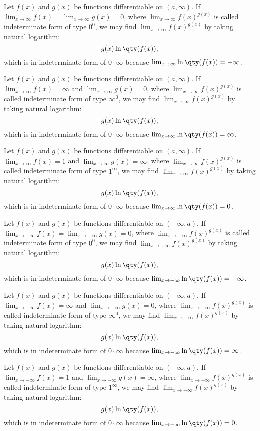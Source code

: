 \documentclass[a4paper,12pt]{report}
\begin{document}
\begin{itemize}
\begin{itemize}
Let $f(x)$ and $g(x)$ be functions differentiable on $(a,\infty)$. If $\lim_{x\to\infty}f(x)=\lim_{x\to\infty}g(x)=0$, where $\lim_{x\to\infty}f(x)^{g(x)}$ is called indeterminate form of type $0^0$, we may find $\lim_{x\to\infty}f(x)^{g(x)}$ by taking natural logarithm:
\[g(x)\ln\qty(f(x)),\]
which is in indeterminate form of $0\cdot\infty$ because $\lim_{x\to\infty}\ln\qty(f(x))=-\infty$.

Let $f(x)$ and $g(x)$ be functions differentiable on $(a,\infty)$. If $\lim_{x\to\infty}f(x)=\infty$ and $\lim_{x\to\infty}g(x)=0$, where $\lim_{x\to\infty}f(x)^{g(x)}$ is called indeterminate form of type $\infty^0$, we may find $\lim_{x\to\infty}f(x)^{g(x)}$ by taking natural logarithm:
\[g(x)\ln\qty(f(x)),\]
which is in indeterminate form of $0\cdot\infty$ because $\lim_{x\to\infty}\ln\qty(f(x))=\infty$.

Let $f(x)$ and $g(x)$ be functions differentiable on $(a,\infty)$. If $\lim_{x\to\infty}f(x)=1$ and $\lim_{x\to\infty}g(x)=\infty$, where $\lim_{x\to\infty}f(x)^{g(x)}$ is called indeterminate form of type $1^{\infty}$, we may find $\lim_{x\to\infty}f(x)^{g(x)}$ by taking natural logarithm:
\[g(x)\ln\qty(f(x)),\]
which is in indeterminate form of $0\cdot\infty$ because $\lim_{x\to\infty}\ln\qty(f(x))=0$.

Let $f(x)$ and $g(x)$ be functions differentiable on $(-\infty,a)$. If $\lim_{x\to -\infty}f(x)=\lim_{x\to -\infty}g(x)=0$, where $\lim_{x\to -\infty}f(x)^{g(x)}$ is called indeterminate form of type $0^0$, we may find $\lim_{x\to -\infty}f(x)^{g(x)}$ by taking natural logarithm:
\[g(x)\ln\qty(f(x)),\]
which is in indeterminate form of $0\cdot\infty$ because $\lim_{x\to -\infty}\ln\qty(f(x))=-\infty$.

Let $f(x)$ and $g(x)$ be functions differentiable on $(-\infty,a)$. If $\lim_{x\to -\infty}f(x)=\infty$ and $\lim_{x\to -\infty}g(x)=0$, where $\lim_{x\to -\infty}f(x)^{g(x)}$ is called indeterminate form of type $\infty^0$, we may find $\lim_{x\to -\infty}f(x)^{g(x)}$ by taking natural logarithm:
\[g(x)\ln\qty(f(x)),\]
which is in indeterminate form of $0\cdot\infty$ because $\lim_{x\to -\infty}\ln\qty(f(x))=\infty$.

Let $f(x)$ and $g(x)$ be functions differentiable on $(-\infty,a)$. If $\lim_{x\to -\infty}f(x)=1$ and $\lim_{x\to -\infty}g(x)=\infty$, where $\lim_{x\to -\infty}f(x)^{g(x)}$ is called indeterminate form of type $1^{\infty}$, we may find $\lim_{x\to -\infty}f(x)^{g(x)}$ by taking natural logarithm:
\[g(x)\ln\qty(f(x)),\]
which is in indeterminate form of $0\cdot\infty$ because $\lim_{x\to -\infty}\ln\qty(f(x))=0$.

\end{itemize}
\end{itemize}
\end{document}
